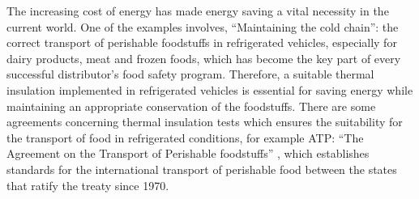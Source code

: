 \documentclass{tQRT2e}
\begin{document}






The increasing cost of energy has made energy saving a vital necessity in the current world. One of the examples involves, “Maintaining the cold chain”: the correct transport of perishable foodstuffs in refrigerated vehicles, especially for dairy products, meat and frozen foods, which has become the key part of every successful distributor’s food safety program. Therefore, a suitable thermal insulation implemented in refrigerated vehicles is essential for saving energy while maintaining an appropriate conservation of the foodstuffs. There are some agreements concerning thermal insulation tests which ensures the suitability for the transport of food in refrigerated conditions, for example ATP: “The Agreement on the Transport of Perishable foodstuffs” \cite{Geneva1970}, which establishes standards for the international transport of perishable food between the states that ratify the treaty since 1970.
\end{document}
